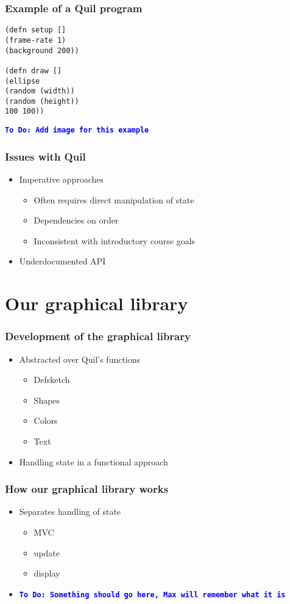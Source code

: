 \documentclass{beamer}
\newcommand{\comment}[1]{{\bf \tt  {#1}}}
\newcommand{\todo}[1]{\textcolor{blue}{\comment{To Do: {#1}}}}
\begin{document}
\begin{frame}[fragile]
\frametitle{Example of a Quil program}
\begin{verbatim}
(defn setup []
(frame-rate 1)
(background 200))

(defn draw []
(ellipse
(random (width))
(random (height))
100 100))
\end{verbatim}
\todo{Add image for this example}
\end{frame}

\begin{frame}
\frametitle{Issues with Quil}
\begin{itemize}
\item Imperative approaches
	\begin{itemize}
		\item Often requires direct manipulation of state
		\item Dependencies on order
		\item Inconsistent with introductory course goals
	\end{itemize}
\item Underdocumented API
\end{itemize}
\end{frame}

\section{Our graphical library}

\begin{frame}
\frametitle{Development of the graphical library}
\begin{itemize}
\item Abstracted over Quil's functions
	\begin{itemize}
	\item Defsketch
	\item Shapes
	\item Colors
	\item Text
	\end{itemize}
\item Handling state in a functional approach
\end{itemize}
\end{frame}


\begin{frame}
\frametitle{How our graphical library works}
\begin{itemize}
\item Separates handling of state
	\begin{itemize}
	\item MVC
	\item update
	\item display
	\end{itemize}
\item \todo{Something should go here, Max will remember what it is}
\end{itemize}
\end{frame}
\end{document}
